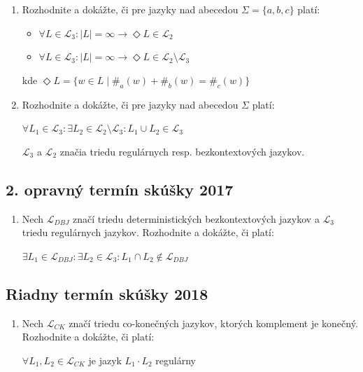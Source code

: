 \documentclass[11pt,a4paper]{article}
\begin{document}
		\begin{enumerate}
			\item Rozhodnite a dokážte, či pre jazyky nad abecedou $\Sigma = \{a,b,c\}$ platí:

			\begin{itemize}
				\item $\forall L \in \mathcal{L}_3: \vert L \vert = \infty \rightarrow \Diamond L \in  \mathcal{L}_2$
				\item $\forall L \in \mathcal{L}_3: \vert L \vert = \infty \rightarrow \Diamond L \in  \mathcal{L}_2 \setminus \mathcal{L}_3$
			\end{itemize}
	
			kde $\Diamond L = \{w \in L \mid \#_a(w) + \#_b(w) = \#_c(w)\}$

			\item Rozhodnite a dokážte, či pre jazyky nad abecedou $\Sigma$ platí:
	
			$\forall L_1 \in \mathcal{L}_3: \exists L_2 \in \mathcal{L}_2 \setminus \mathcal{L}_3: L_1 \cup L_2 \in \mathcal{L}_3$
	
			$\mathcal{L}_3$ a $\mathcal{L}_2$ značia triedu regulárnych resp. bezkontextových jazykov.
		\end{enumerate}
	
		\subsection{2. opravný termín skúšky 2017}

		\begin{enumerate}
			\item Nech $\mathcal{L}_{DBJ}$ značí triedu deterministických bezkontextových jazykov a $\mathcal{L}_{3}$ triedu regulárnych jazykov. Rozhodnite a dokážte, či platí:

			$\exists L_1 \in \mathcal{L}_{DBJ}: \exists L_2 \in \mathcal{L}_{3}: L_1 \cap L_2 \notin \mathcal{L}_{DBJ}$
		\end{enumerate}

		\subsection{Riadny termín skúšky 2018}

		\begin{enumerate}
			\item Nech $\mathcal{L}_{CK}$ značí triedu co-konečných jazykov, ktorých komplement je konečný. Rozhodnite a dokážte, či platí:

			$\forall L_1, L_2 \in \mathcal{L}_{CK}$ je jazyk $L_1 \cdot L_2$ regulárny
		\end{enumerate}
	
\end{document}
